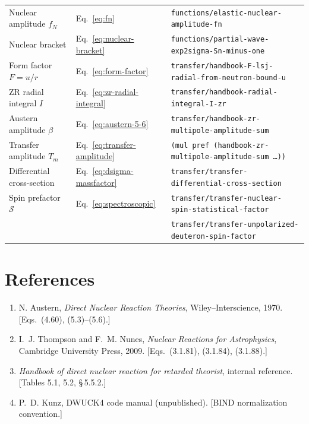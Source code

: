 \documentclass[12pt,a4paper]{article}
\begin{document}
\begin{table}[h]
\begin{tabular}{lll}
Nuclear amplitude $f_N$ & Eq.~\eqref{eq:fn}
  & \texttt{functions/elastic-nuclear-amplitude-fn} \\
Nuclear bracket & Eq.~\eqref{eq:nuclear-bracket}
  & \texttt{functions/partial-wave-exp2sigma-Sn-minus-one} \\
Form factor $F = u/r$ & Eq.~\eqref{eq:form-factor}
  & \texttt{transfer/handbook-F-lsj-radial-from-neutron-bound-u} \\
ZR radial integral $I$ & Eq.~\eqref{eq:zr-radial-integral}
  & \texttt{transfer/handbook-radial-integral-I-zr} \\
Austern amplitude $\beta$ & Eq.~\eqref{eq:austern-5-6}
  & \texttt{transfer/handbook-zr-multipole-amplitude-sum} \\
Transfer amplitude $T_m$ & Eq.~\eqref{eq:transfer-amplitude}
  & \texttt{(mul pref (handbook-zr-multipole-amplitude-sum \ldots))} \\
Differential cross-section & Eq.~\eqref{eq:dsigma-massfactor}
  & \texttt{transfer/transfer-differential-cross-section} \\
Spin prefactor $\mathcal{S}$ & Eq.~\eqref{eq:spectroscopic}
  & \texttt{transfer/transfer-nuclear-spin-statistical-factor} \\
  &   & \texttt{transfer/transfer-unpolarized-deuteron-spin-factor} \\
\bottomrule
\end{tabular}
\end{table}

\section*{References}

\begin{enumerate}
  \item N. Austern, \textit{Direct Nuclear Reaction Theories},
        Wiley--Interscience, 1970.  [Eqs.~(4.60), (5.3)--(5.6).]
  \item I.~J. Thompson and F.~M. Nunes,
        \textit{Nuclear Reactions for Astrophysics},
        Cambridge University Press, 2009.  [Eqs.~(3.1.81), (3.1.84), (3.1.88).]
  \item \textit{Handbook of direct nuclear reaction for retarded theorist},
        internal reference.  [Tables 5.1, 5.2, \S\,5.5.2.]
  \item P.~D. Kunz, DWUCK4 code manual (unpublished).
        [BIND normalization convention.]
\end{enumerate}
\end{document}
